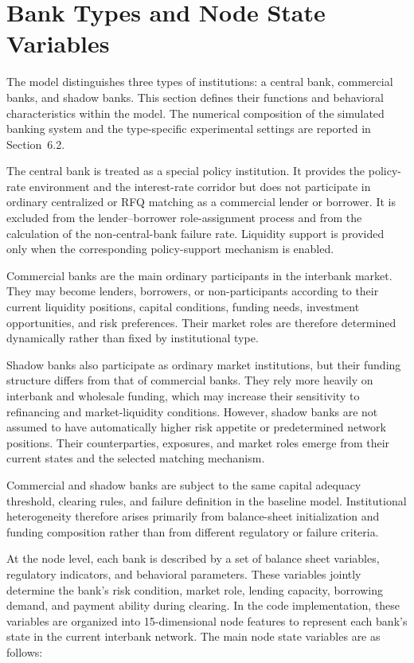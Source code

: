 \section{Bank Types and Node State Variables}

The model distinguishes three types of institutions: a central bank,
commercial banks, and shadow banks. This section defines their functions
and behavioral characteristics within the model. The numerical
composition of the simulated banking system and the type-specific
experimental settings are reported in Section~6.2.

The central bank is treated as a special policy institution. It provides
the policy-rate environment and the interest-rate corridor but does not
participate in ordinary centralized or RFQ matching as a commercial
lender or borrower. It is excluded from the lender--borrower
role-assignment process and from the calculation of the non-central-bank
failure rate. Liquidity support is provided only when the corresponding
policy-support mechanism is enabled.

Commercial banks are the main ordinary participants in the interbank
market. They may become lenders, borrowers, or non-participants
according to their current liquidity positions, capital conditions,
funding needs, investment opportunities, and risk preferences. Their
market roles are therefore determined dynamically rather than fixed by
institutional type.

Shadow banks also participate as ordinary market institutions, but their
funding structure differs from that of commercial banks. They rely more
heavily on interbank and wholesale funding, which may increase their
sensitivity to refinancing and market-liquidity conditions. However,
shadow banks are not assumed to have automatically higher risk appetite
or predetermined network positions. Their counterparties, exposures, and
market roles emerge from their current states and the selected matching
mechanism.

Commercial and shadow banks are subject to the same capital adequacy
threshold, clearing rules, and failure definition in the baseline model.
Institutional heterogeneity therefore arises primarily from
balance-sheet initialization and funding composition rather than from
different regulatory or failure criteria.

At the node level, each bank is described by a set of balance sheet
variables, regulatory indicators, and behavioral parameters. These
variables jointly determine the bank's risk condition, market role,
lending capacity, borrowing demand, and payment ability during clearing.
In the code implementation, these variables are organized into
15-dimensional node features to represent each bank's state in the
current interbank network. The main node state variables are as follows:


